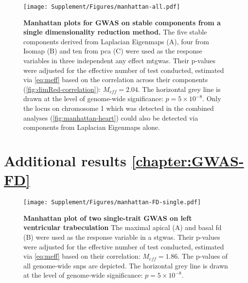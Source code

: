 \begin{figure}[hbtp]
	\centering
	\texttt{[image: Supplement/Figures/manhattan-all.pdf]}
	\caption[\textbf{Manhattan plots for GWAS on stable components from a single dimensionality reduction method. }]{\textbf{Manhattan plots for GWAS on stable components from a single dimensionality reduction method. }The five stable components derived from Laplacian Eigenmaps (A), four from Isomap (B) and ten from \gls{pca} (C) were used as the response variables in three independent any effect \gls{mtgwas}. Their p-values were adjusted for the effective number of test conducted, estimated via \cref{eq:meff} based on the correlation across their components (\cref{fig:dimRed-correlation}): \(M_{eff}=2.04\). The horizontal grey line is drawn at the level of genome-wide significance: \(p = 5 \times 10^{-8}\). Only the locus on chromosome 1 which was detected in the combined analyses (\cref{fig:manhattan-heart}) could also be detected via components from Laplacian Eigenmaps alone. } 
	 	\label{fig:manhattan-3Dheart-single}
\end{figure}

\newpage
\section{Additional results \cref{chapter:GWAS-FD}}
\begin{figure}[hbtp]
	\centering
	\texttt{[image: Supplement/Figures/manhattan-FD-single.pdf]}
	\caption[\textbf{Manhattan plot of  two single-trait GWAS on left ventricular trabeculation. }]{\textbf{Manhattan plot of two single-trait GWAS on left ventricular trabeculation } The maximal apical (A) and basal \gls{fd} (B) were used as the response variable in a \gls{stgwas}.  Their p-values were adjusted for the effective number of test conducted, estimated via \cref{eq:meff} based on their correlation: \(M_{eff}=1.86\). The p-values of all genome-wide \glspl{snp} are depicted. The horizontal grey line is drawn at the level of genome-wide significance: \(p = 5 \times 10^{-8}\).} 
	 	\label{fig:manhattan-FD-single}
\end{figure}



